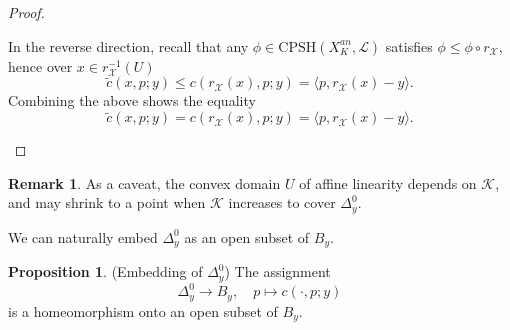 \documentclass[a4paper]{article}
\theoremstyle{definition}
\newtheorem{rmk}[thm]{Remark}
\newtheorem{prop}[thm]{Proposition}
\begin{document}
\begin{proof}
\begin{enumerate}
	
In the reverse direction,  recall  that any $\phi\in \text{CPSH}(X_K^{an},\mathcal{L})$ satisfies $\phi\leq \phi\circ r_\mathcal{X}$, hence over $x\in r_\mathcal{X}^{-1}(U)$
\[
\tilde{c}(x, p;y) \leq c(  r_{\mathcal{X}}  (x), p;y  )= \langle p,  r_\mathcal{X}(x)-  y\rangle.
\]
	Combining the above shows the equality
	\[
	\tilde{c}(x, p;y) = c(  r_{\mathcal{X}}  (x), p;y  )= \langle p,  r_\mathcal{X}(x)-  y\rangle.
	\]
	
	

	
		\end{enumerate}
	\end{proof}

	
	
	
	
	
		\begin{rmk}
		As a caveat, the convex domain $U$ of affine linearity depends on $\mathcal{K}$, and may shrink to a point when $\mathcal{K}$ increases to cover $\Delta_y^0$. 
		
		
	\end{rmk}
	
	
	
	
	
We can naturally embed $\Delta_y^0$ as an open subset of $B_y$.


	
	
	
	
	
	\begin{prop}\label{prop:homeotoimage}(Embedding of $\Delta_y^0$)
	The assignment 
	\[
	\Delta_y^0\to B_y,\quad p\mapsto c(\cdot, p; y)
	\]
	is a homeomorphism onto an open subset of $B_y$. 
	\end{prop}
	
	
	
	
	
\end{document}
